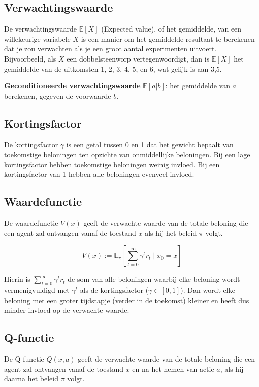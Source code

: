 \documentclass[a4paper,12pt]{report}
\begin{document}
\subsection*{Verwachtingswaarde}

De verwachtingswaarde \(\mathbb{E}[X]\) (Expected value), of het gemiddelde,
van een willekeurige variabele \(X\) is een manier om het gemiddelde resultaat
te berekenen dat je zou verwachten als je een groot aantal experimenten
uitvoert. Bijvoorbeeld, als \(X\) een dobbelsteenworp vertegenwoordigt, dan is
\(\mathbb{E}[X]\) het gemiddelde van de uitkomsten 1, 2, 3, 4, 5, en 6, wat
gelijk is aan 3,5.

\textbf{Geconditioneerde verwachtingswaarde} \(\mathbb{E}[a|b]\): het gemiddelde van \(a\) berekenen, gegeven de voorwaarde \(b\).

\subsection*{Kortingsfactor}

De kortingsfactor \(\gamma\) is een getal tussen 0 en 1 dat het gewicht bepaalt
van toekomstige beloningen ten opzichte van onmiddellijke beloningen. Bij een
lage kortingsfactor hebben toekomstige beloningen weinig invloed. Bij een
kortingsfactor van 1 hebben alle beloningen evenveel invloed.

\subsection*{Waardefunctie}

De waardefunctie \(V(x)\) geeft de verwachte waarde van de totale beloning die
een agent zal ontvangen vanaf de toestand \(x\) als hij het beleid \(\pi\)
volgt.

\[
    V(x) := \mathbb{E}_{\pi}\left[\sum_{t=0}^{\infty} \gamma^t r_t \mid x_0 = x\right]
\]

Hierin is \(\sum_{t=0}^{\infty} \gamma^t r_t\) de som van alle beloningen
waarbij elke beloning wordt vermenigvuldigd met \(\gamma^t\) als de
kortingsfactor (\(\gamma \in [0,1]\)). Dan wordt elke beloning met een groter
tijdstapje (verder in de toekomst) kleiner en heeft dus minder invloed op de
verwachte waarde.

\subsection*{Q-functie}

De Q-functie \(Q(x,a)\) geeft de verwachte waarde van de totale beloning die
een agent zal ontvangen vanaf de toestand \(x\) en na het nemen van actie
\(a\), als hij daarna het beleid \(\pi\) volgt.
\end{document}
